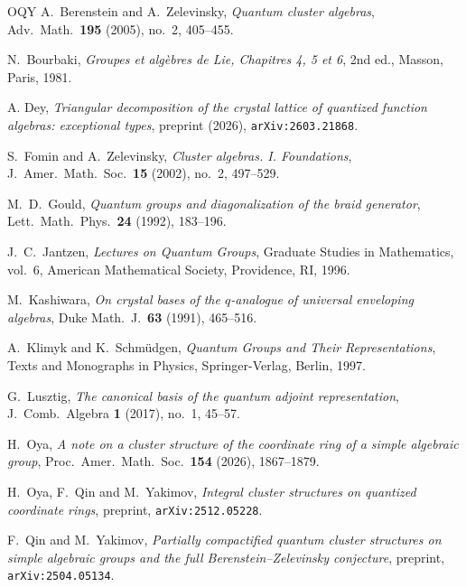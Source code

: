 \documentclass[12pt]{amsart}
\theoremstyle{plain}
\theoremstyle{remark}
\begin{document}
\begin{thebibliography}{OQY}
 A.~Berenstein and A.~Zelevinsky, \emph{Quantum cluster algebras},
Adv.\ Math.\ \textbf{195} (2005), no.~2, 405--455.

 N.~Bourbaki, \emph{Groupes et alg\`ebres de Lie, Chapitres
4, 5 et 6}, 2nd ed., Masson, Paris, 1981.

A. Dey,
\emph{Triangular decomposition of the crystal lattice of quantized function
algebras: exceptional types},
preprint (2026), \texttt{arXiv:2603.21868}.

 S.~Fomin and A.~Zelevinsky, \emph{Cluster algebras. I. Foundations},
J.\ Amer.\ Math.\ Soc.\ \textbf{15} (2002), no.~2, 497--529.

 M.~D.~Gould, \emph{Quantum groups and diagonalization of the
braid generator}, Lett.\ Math.\ Phys.\ \textbf{24} (1992), 183--196.

 J.~C.~Jantzen, \emph{Lectures on Quantum Groups}, Graduate
Studies in Mathematics, vol.~6, American Mathematical Society, Providence, RI, 1996.

 M.~Kashiwara, \emph{On crystal bases of the $q$-analogue of
universal enveloping algebras}, Duke Math.\ J.\ \textbf{63} (1991), 465--516.

 A.~Klimyk and K.~Schm\"udgen, \emph{Quantum Groups and Their
Representations}, Texts and Monographs in Physics, Springer-Verlag, Berlin, 1997.

 G.~Lusztig, \emph{The canonical basis of the quantum adjoint
representation}, J.\ Comb.\ Algebra \textbf{1} (2017), no.~1, 45--57.

 H.~Oya, \emph{A note on a cluster structure of the coordinate ring
of a simple algebraic group}, Proc.\ Amer.\ Math.\ Soc.\ \textbf{154} (2026),
1867--1879.

 H.~Oya, F.~Qin and M.~Yakimov,
\emph{Integral cluster structures on quantized coordinate rings},
preprint, \texttt{arXiv:2512.05228}.

 F.~Qin and M.~Yakimov, \emph{Partially compactified quantum
cluster structures on simple algebraic groups and the full
Beren\-stein--Zelevinsky conjecture}, preprint, \texttt{arXiv:2504.05134}.
\end{thebibliography}
\end{document}

